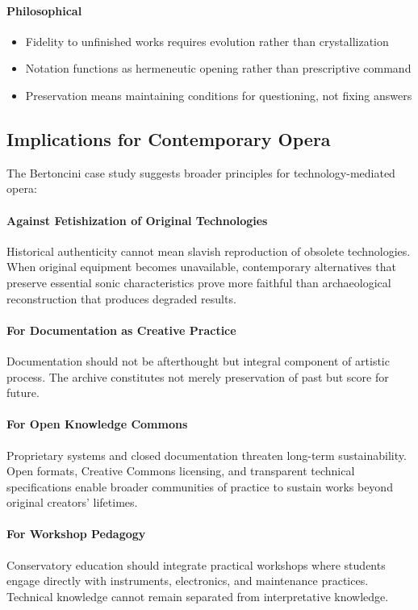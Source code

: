 \paragraph{Philosophical}
\begin{itemize}
  \item Fidelity to unfinished works requires evolution rather than 
  crystallization
  \item Notation functions as hermeneutic opening rather than prescriptive 
  command
  \item Preservation means maintaining conditions for questioning, not fixing 
  answers
\end{itemize}

\subsection{Implications for Contemporary Opera}

The Bertoncini case study suggests broader principles for technology-mediated 
opera:

\paragraph{Against Fetishization of Original Technologies}
Historical authenticity cannot mean slavish reproduction of obsolete 
technologies. When original equipment becomes unavailable, contemporary 
alternatives that preserve essential sonic characteristics prove more faithful 
than archaeological reconstruction that produces degraded results.

\paragraph{For Documentation as Creative Practice}
Documentation should not be afterthought but integral component of artistic 
process. The archive constitutes not merely preservation of past but score for 
future.

\paragraph{For Open Knowledge Commons}
Proprietary systems and closed documentation threaten long-term sustainability. 
Open formats, Creative Commons licensing, and transparent technical 
specifications enable broader communities of practice to sustain works beyond 
original creators' lifetimes.

\paragraph{For Workshop Pedagogy}
Conservatory education should integrate practical workshops where students 
engage directly with instruments, electronics, and maintenance practices. 
Technical knowledge cannot remain separated from interpretative knowledge.

